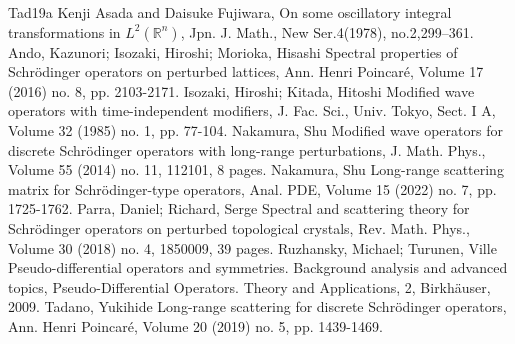 
\begin{thebibliography}{Tad19a}
 Kenji Asada and Daisuke Fujiwara, On some oscillatory integral transformations in $L^2(\mathbb{R}^n)$, Jpn. J. Math., New Ser.4(1978), no.2,299–361.
 Ando, Kazunori; Isozaki, Hiroshi; Morioka, Hisashi Spectral properties of Schrödinger operators on perturbed lattices, Ann. Henri Poincaré, Volume 17 (2016) no. 8, pp. 2103-2171.
 Isozaki, Hiroshi; Kitada, Hitoshi Modified wave operators with time-independent modifiers, J. Fac. Sci., Univ. Tokyo, Sect. I A, Volume 32 (1985) no. 1, pp. 77-104.
 Nakamura, Shu Modified wave operators for discrete Schrödinger operators with long-range perturbations, J. Math. Phys., Volume 55 (2014) no. 11, 112101, 8 pages.
 Nakamura, Shu Long-range scattering matrix for Schrödinger-type operators, Anal. PDE, Volume 15 (2022) no. 7, pp. 1725-1762.
 Parra, Daniel; Richard, Serge Spectral and scattering theory for Schrödinger operators on perturbed topological crystals, Rev. Math. Phys., Volume 30 (2018) no. 4, 1850009, 39 pages.
 Ruzhansky, Michael; Turunen, Ville Pseudo-differential operators and symmetries. Background analysis and advanced topics, Pseudo-Differential Operators. Theory and Applications, 2, Birkhäuser, 2009.
 Tadano, Yukihide Long-range scattering for discrete Schrödinger operators, Ann. Henri Poincaré, Volume 20 (2019) no. 5, pp. 1439-1469.
\end{thebibliography}
